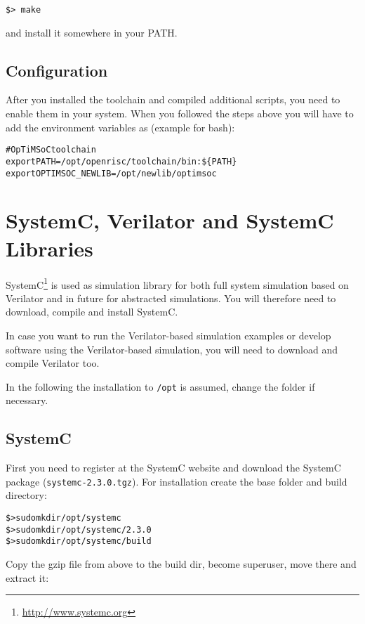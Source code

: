 \begin{verbatim}
$> make
\end{verbatim}

and install it somewhere in your PATH.

\subsection{Configuration}

After you installed the toolchain and compiled additional scripts, you
need to enable them in your system. When you followed the steps above
you will have to add the environment variables as (example for bash):

\begin{alltt}
# OpTiMSoC toolchain
export PATH=/opt/openrisc/toolchain/bin:\$\{PATH\}
export OPTIMSOC_NEWLIB=/opt/newlib/optimsoc
\end{alltt}

\section{SystemC, Verilator and SystemC Libraries}

SystemC\footnote{\url{http://www.systemc.org}} is used as simulation
library for both full system simulation based on Verilator and in
future for abstracted simulations. You will therefore need to
download, compile and install SystemC.

In case you want to run the Verilator-based simulation examples or
develop software using the Verilator-based simulation, you will need
to download and compile Verilator too.

In the following the installation to \verb|/opt| is assumed, change
the folder if necessary.

\subsection{SystemC}

First you need to register at the SystemC website and download the
SystemC package (\verb|systemc-2.3.0.tgz|). For installation create
the base folder and build directory:

\begin{alltt}
\$> sudo mkdir /opt/systemc
\$> sudo mkdir /opt/systemc/2.3.0
\$> sudo mkdir /opt/systemc/build
\end{alltt}

Copy the gzip file from above to the build dir, become superuser, move
there and extract it:

